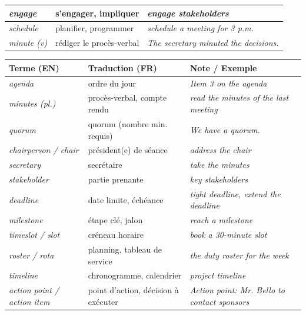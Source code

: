 \documentclass[11pt]{article}
\newcommand{\eng}[1]{\ifmmode\text{\textit{#1}}\else\begingroup\selectlanguage{english}\itshape #1\endgroup\fi}
\begin{document}
\begin{definition}
\begin{center}
\begin{tabularx}{\linewidth}{|X|X|X|}
\eng{engage} & s'engager, impliquer & \eng{engage stakeholders} \\ \hline
\eng{schedule} & planifier, programmer & \eng{schedule a meeting for 3 p.m.} \\ \hline
\eng{minute} (v) & rédiger le procès-verbal & \eng{The secretary minuted the decisions.} \\ \hline
\end{tabularx}
\end{center}
\end{definition}

\begin{definition}
\begin{center}
\begin{tabularx}{\linewidth}{|X|X|X|}\hline
\rowcolor{poporangeL} \textbf{Terme (EN)} & \textbf{Traduction (FR)} & \textbf{Note / Exemple} \\ \hline
\eng{agenda} & ordre du jour & \eng{Item 3 on the agenda} \\ \hline
\eng{minutes} (pl.) & procès-verbal, compte rendu & \eng{read the minutes of the last meeting} \\ \hline
\eng{quorum} & quorum (nombre min. requis) & \eng{We have a quorum.} \\ \hline
\eng{chairperson} / \eng{chair} & président(e) de séance & \eng{address the chair} \\ \hline
\eng{secretary} & secrétaire & \eng{take the minutes} \\ \hline
\eng{stakeholder} & partie prenante & \eng{key stakeholders} \\ \hline
\eng{deadline} & date limite, échéance & \eng{tight deadline, extend the deadline} \\ \hline
\eng{milestone} & étape clé, jalon & \eng{reach a milestone} \\ \hline
\eng{timeslot} / \eng{slot} & créneau horaire & \eng{book a 30-minute slot} \\ \hline
\eng{roster} / \eng{rota} & planning, tableau de service & \eng{the duty roster for the week} \\ \hline
\eng{timeline} & chronogramme, calendrier & \eng{project timeline} \\ \hline
\eng{action point} / \eng{action item} & point d'action, décision à exécuter & \eng{Action point: Mr. Bello to contact sponsors} \\ \hline
\end{tabularx}
\end{center}
\end{definition}
\end{document}
